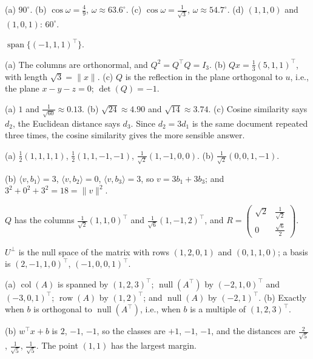 \documentclass[11pt]{article}
\theoremstyle{definition}
\newcommand{\norm}[1]{\lVert #1 \rVert}
\newcommand{\ip}[2]{\langle #1, #2 \rangle}
\DeclareMathOperator{\Null}{null}
\DeclareMathOperator{\col}{col}
\DeclareMathOperator{\row}{row}
\DeclareMathOperator{\Span}{span}
\begin{document}
\begin{description}[leftmargin=0pt, itemsep=0.3em]
    \item[\ref{pr:angles}.] (a) $90^\circ$. (b) $\cos\omega = \frac{4}{9}$, $\omega \approx 63.6^\circ$. (c) $\cos\omega = \frac{1}{\sqrt{3}}$, $\omega \approx 54.7^\circ$. (d) $(1, 1, 0)$ and $(1, 0, 1)$: $60^\circ$.
    \item[\ref{pr:orth-to-two}.] $\Span\{(-1, 1, 1)^\top\}$.
    \item[\ref{pr:householder-q}.] (a) The columns are orthonormal, and $Q^2 = Q^\top Q = I_3$. (b) $Qx = \frac{1}{3}(5, 1, 1)^\top$, with length $\sqrt{3} = \norm{x}$. (c) $Q$ is the reflection in the plane orthogonal to $u$, i.e., the plane $x - y - z = 0$; $\det(Q) = -1$.
    \item[\ref{pr:cosine-docs}.] (a) $1$ and $\frac{1}{\sqrt{60}} \approx 0.13$. (b) $\sqrt{24} \approx 4.90$ and $\sqrt{14} \approx 3.74$. (c) Cosine similarity says $d_2$, the Euclidean distance says $d_3$. Since $d_2 = 3d_1$ is the same document repeated three times, the cosine similarity gives the more sensible answer.
    \item[\ref{pr:gs-haar}.] (a) $\frac{1}{2}(1, 1, 1, 1)$, $\frac{1}{2}(1, 1, -1, -1)$, $\frac{1}{\sqrt{2}}(1, -1, 0, 0)$. (b) $\frac{1}{\sqrt{2}}(0, 0, 1, -1)$.
    \item[\ref{pr:onb-coords}.] (b) $\ip{v}{b_1} = 3$, $\ip{v}{b_2} = 0$, $\ip{v}{b_3} = 3$, so $v = 3b_1 + 3b_3$; and $3^2 + 0^2 + 3^2 = 18 = \norm{v}^2$.
    \item[\ref{pr:qr}.] $Q$ has the columns $\frac{1}{\sqrt{2}}(1, 1, 0)^\top$ and $\frac{1}{\sqrt{6}}(1, -1, 2)^\top$, and $R = \begin{pmatrix} \sqrt{2} & \frac{1}{\sqrt{2}} \\ 0 & \frac{\sqrt{6}}{2} \end{pmatrix}$.
    \item[\ref{pr:complement}.] $U^\perp$ is the null space of the matrix with rows $(1, 2, 0, 1)$ and $(0, 1, 1, 0)$; a basis is $(2, -1, 1, 0)^\top$, $(-1, 0, 0, 1)^\top$.
    \item[\ref{pr:four-subspaces}.] (a) $\col(A)$ is spanned by $(1, 2, 3)^\top$; $\Null(A^\top)$ by $(-2, 1, 0)^\top$ and $(-3, 0, 1)^\top$; $\row(A)$ by $(1, 2)^\top$; and $\Null(A)$ by $(-2, 1)^\top$. (b) Exactly when $b$ is orthogonal to $\Null(A^\top)$, i.e., when $b$ is a multiple of $(1, 2, 3)^\top$.
    \item[\ref{pr:classifier}.] (b) $w^\top x + b$ is $2$, $-1$, $-1$, so the classes are $+1$, $-1$, $-1$, and the distances are $\frac{2}{\sqrt{5}}$, $\frac{1}{\sqrt{5}}$, $\frac{1}{\sqrt{5}}$. The point $(1, 1)$ has the largest margin.

\end{description}
\end{document}
